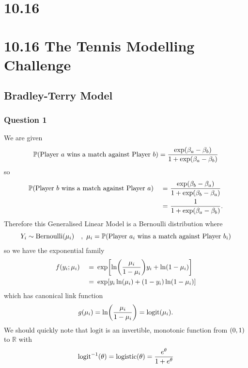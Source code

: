 \documentclass[11pt]{article} %
\let\originalleft\left
\let\originalright\right
\renewcommand{\left}{\mathopen{}\mathclose\bgroup\originalleft}
\renewcommand{\right}{\aftergroup\egroup\originalright}
\newcommand{\logit}{\text{logit}}
\newcommand{\logistic}{\text{logistic}}
\begin{document}
\section*{10.16}
\vspace*{6cm}

\section*{10.16 The Tennis Modelling Challenge}
\subsection*{Bradley-Terry Model}
\subsubsection*{Question 1}
We are given
\begin{equation}
	\mathbb{P}\left(\text{Player }a\text{ wins a match against Player }b\right) = \frac{\exp\left(\beta_a - \beta_b\right)}{1+\exp\left(\beta_a - \beta_b\right)}
	\label{eqn:q1_model}
\end{equation}
so
\begin{alignat}{2}
	& \mathbb{P}\left(\text{Player }b\text{ wins a match against Player }a\right) &\ =\ & \frac{\exp\left(\beta_b - \beta_a\right)}{1+\exp\left(\beta_b - \beta_a\right)}
	\label{eqn:param_swap}\\
	& &\ =\ & \frac{1}{1+\exp\left(\beta_a - \beta_b\right)}\nonumber.
\end{alignat}
Therefore this Generalised Linear Model is a Bernoulli distribution where 
\begin{equation*}
	Y_i \sim \mbox{Bernoulli}\left(\mu_i\right)\quad,\ \mu_i = \mathbb{P}\left(\text{Player }a_i\text{ wins a match against Player }b_i\right)
\end{equation*}
so we have the exponential family
\begin{alignat*}{2}
	& f\left(y_i; \mu_i \right) &\ =\ & \exp\left[\ln\left({\frac{\mu_i}{1-\mu_i}}\right)y_i+ \ln\left({1-\mu_i}\right)\right] \\
	& &\ =\ & \exp\left[y_i\ln\left(\mu_i\right)+ \left(1-y_i\right)\ln\left({1-\mu_i}\right)\right]
\end{alignat*}
which has canonical link function
\begin{equation*}
	g\left(\mu_i\right) = \ln\left(\frac{\mu_i}{1-\mu_i}\right)=\text{logit}\left(\mu_i\right).
\end{equation*}
We should quickly note that $\logit$ is an invertible, monotonic function from $\left(0, 1\right)$ to $\mathbb{R}$ with
\begin{equation*}
	\logit^{-1}\left(\theta\right) = \logistic\left(\theta\right) = \frac{e^\theta}{1+e^\theta}
\end{equation*}
\end{document}

